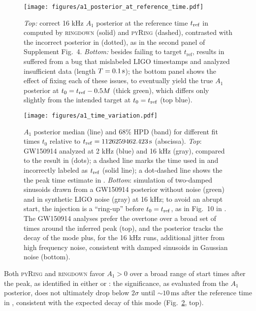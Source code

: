 \documentclass[aps,prd,twocolumn,superscriptaddress,preprintnumbers,floatfix,nofootinbib]{revtex4-2}
\begin{document}
\begin{figure}
  \texttt{[image: figures/a1\_posterior\_at\_reference\_time.pdf]}
  \caption{\emph{Top:} correct 16 kHz $A_1$ posterior at the reference time $t_{\rm ref}$ in \cite{Isi:2019aib} computed by \textsc{ringdown} (solid) and \textsc{pyRing} (dashed), contrasted with the incorrect posterior in \cite{Cotesta:2022pci} (dotted), as in the second panel of Supplement Fig.~4.
  \emph{Bottom:}
  besides failing to target $t_\mathrm{ref}$, results in~\cite{Cotesta:2022pci} suffered from a bug that mislabeled LIGO timestamps and analyzed insufficient data (length $T = 0.1\,{\rm s}$); the bottom panel shows the effect of fixing each of these issues, to eventually yield the true $A_1$ posterior at $t_0 = t_{\rm ref} - 0.5 M$ (thick green), which differs only slightly from the intended target at $t_0 = t_{\rm ref}$ (top blue).
  \label{fig:reftime}
}
\end{figure}

\begin{figure}
  \texttt{[image: figures/a1\_time\_variation.pdf]}
  \caption{$A_1$ posterior median (line) and 68\% HPD (band) for different fit times $t_0$ relative to $t_{\rm ref} = 1126259462.423 \, \mathrm{s}$ (abscissa). \emph{Top}: GW150914 analyzed at 2 kHz (blue) and 16 kHz (gray), compared to the result in \cite{Finch:2022ynt} (dots); a dashed line marks the time used in \cite{Cotesta:2022pci} and incorrectly labeled as $t_{\rm ref}$ (solid line); a dot-dashed line shows the the peak time estimate in \cite{Cotesta:2022pci}.
  \emph{Bottom}: simulation of two-damped sinusoids drawn from a GW150914 posterior without noise (green) and in synthetic LIGO noise (gray) at 16 kHz; to avoid an abrupt start, the injection is a ``ring-up'' before $t_0 = t_{\rm ref}$, as in Fig.~10 in \cite{Isi:2021iql}.
  The GW150914 analyses prefer the overtone over a broad set of times around the inferred peak (top), and the posterior tracks the decay of the mode plus, for the 16 kHz runs, additional jitter from high frequency noise, consistent with damped sinusoids in Gaussian noise (bottom).}
  \label{fig:variation}
\end{figure}

Both \textsc{pyRing} and \textsc{ringdown} favor $A_1 > 0$ over a broad range of start times after the peak, as identified in either  \cite{Isi:2022mhy} or  \cite{Cotesta:2022pci}:
the significance, as evaluated from the $A_1$ posterior, does not ultimately drop below $2\sigma$ until {${\sim}10\,\mathrm{ms}$} after the reference time in \cite{Isi:2022mhy}, consistent with the expected decay of this mode (Fig.~\ref{fig:variation}, top).
\end{document}
